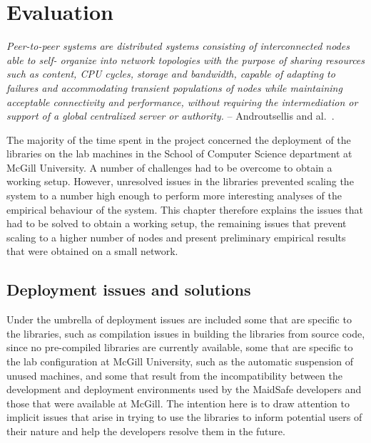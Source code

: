 \chapter{Evaluation}

\textit{Peer-to-peer systems are distributed systems consisting of interconnected nodes able to self- organize into network topologies with the purpose of sharing resources such as content, CPU cycles, storage and bandwidth, capable of adapting to failures and accommodating transient populations of nodes while maintaining acceptable connectivity and performance, without requiring the intermediation or support of a global centralized server or authority.} -- Androutsellis and al.~\cite{Androutsellis-Theotokis:2004}.





The majority of the time spent in the project concerned the deployment of the libraries on the lab machines in the School of Computer Science department at McGill University. A number of challenges had to be overcome to obtain a working setup. However, unresolved issues in the libraries prevented scaling the system to a number high enough to perform more interesting analyses of the empirical behaviour of the system. This chapter therefore explains the issues that had to be solved to obtain a working setup, the remaining issues that prevent scaling to a higher number of nodes and present preliminary empirical results that were obtained on a small network.

\section{Deployment issues and solutions}

Under the umbrella of deployment issues are included some that are specific to the libraries, such as compilation issues in building the libraries from source code, since no pre-compiled libraries are currently available, some that are specific to the lab configuration at McGill University, such as the automatic suspension of unused machines, and some that result from the incompatibility between the development and deployment environments used by the MaidSafe developers and those that were available at McGill. The intention here is to draw attention to implicit issues that arise in trying to use the libraries to inform potential users of their nature and help the developers resolve them in the future.


